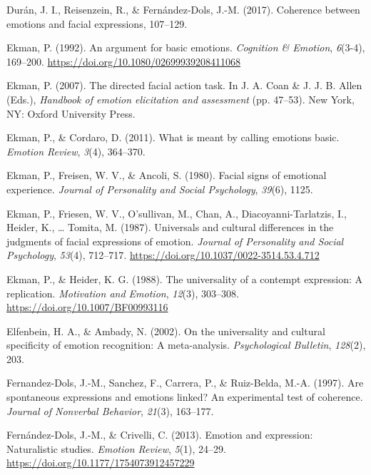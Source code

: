 \documentclass[man]{apa6}
\begin{document}
\leavevmode\hypertarget{ref-duran2017coherence}{}%
Durán, J. I., Reisenzein, R., \& Fernández-Dols, J.-M. (2017). Coherence between emotions and facial expressions, 107--129.

\leavevmode\hypertarget{ref-ekman1992argument}{}%
Ekman, P. (1992). An argument for basic emotions. \emph{Cognition \& Emotion}, \emph{6}(3-4), 169--200. \url{https://doi.org/10.1080/02699939208411068}

\leavevmode\hypertarget{ref-ekman2007directed}{}%
Ekman, P. (2007). The directed facial action task. In J. A. Coan \& J. J. B. Allen (Eds.), \emph{Handbook of emotion elicitation and assessment} (pp. 47--53). New York, NY: Oxford University Press.

\leavevmode\hypertarget{ref-ekman2011meant}{}%
Ekman, P., \& Cordaro, D. (2011). What is meant by calling emotions basic. \emph{Emotion Review}, \emph{3}(4), 364--370.

\leavevmode\hypertarget{ref-ekman1980facial}{}%
Ekman, P., Freisen, W. V., \& Ancoli, S. (1980). Facial signs of emotional experience. \emph{Journal of Personality and Social Psychology}, \emph{39}(6), 1125.

\leavevmode\hypertarget{ref-ekman1987universals}{}%
Ekman, P., Friesen, W. V., O'sullivan, M., Chan, A., Diacoyanni-Tarlatzis, I., Heider, K., \ldots{} Tomita, M. (1987). Universals and cultural differences in the judgments of facial expressions of emotion. \emph{Journal of Personality and Social Psychology}, \emph{53}(4), 712--717. \url{https://doi.org/10.1037/0022-3514.53.4.712}

\leavevmode\hypertarget{ref-ekman1988universality}{}%
Ekman, P., \& Heider, K. G. (1988). The universality of a contempt expression: A replication. \emph{Motivation and Emotion}, \emph{12}(3), 303--308. \url{https://doi.org/10.1007/BF00993116}

\leavevmode\hypertarget{ref-elfenbein2002universality}{}%
Elfenbein, H. A., \& Ambady, N. (2002). On the universality and cultural specificity of emotion recognition: A meta-analysis. \emph{Psychological Bulletin}, \emph{128}(2), 203.

\leavevmode\hypertarget{ref-fernandez1997spontaneous}{}%
Fernandez-Dols, J.-M., Sanchez, F., Carrera, P., \& Ruiz-Belda, M.-A. (1997). Are spontaneous expressions and emotions linked? An experimental test of coherence. \emph{Journal of Nonverbal Behavior}, \emph{21}(3), 163--177.

\leavevmode\hypertarget{ref-fernandez2013emotion}{}%
Fernández-Dols, J.-M., \& Crivelli, C. (2013). Emotion and expression: Naturalistic studies. \emph{Emotion Review}, \emph{5}(1), 24--29. \url{https://doi.org/10.1177/1754073912457229}
\end{document}
